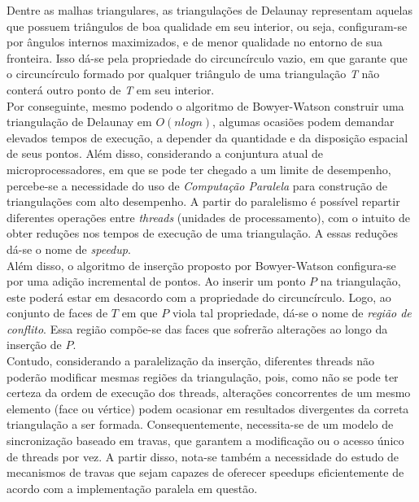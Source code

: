 \documentclass[a4paper, 12pt]{article}
\begin{document}

Dentre as malhas triangulares, as triangulações de Delaunay representam aquelas que possuem triângulos de boa qualidade  
em seu interior, ou seja, configuram-se por ângulos internos maximizados, e de menor qualidade no entorno de sua fronteira. 
Isso dá-se pela propriedade do circuncírculo vazio, em que garante que o circuncírculo formado por qualquer triângulo de uma 
triangulação \textit{T} não conterá outro ponto de \textit{T} em seu interior. \\

Por conseguinte, mesmo podendo o algoritmo de Bowyer-Watson \cite{bowyer, watson} construir uma triangulação de Delaunay em $O(n logn)$, 
algumas ocasiões podem demandar elevados tempos de execução, a depender da quantidade e da disposição espacial de seus pontos. Além disso, 
considerando a conjuntura atual de microprocessadores, em que se pode ter chegado a um limite de desempenho, percebe-se a 
necessidade do uso de \textit{Computação Paralela} para construção de triangulações com  alto desempenho. A partir do 
paralelismo é possível repartir diferentes operações entre \textit{threads} (unidades de processamento), com o intuito de obter 
reduções nos tempos de execução de uma triangulação. A essas reduções dá-se o nome de \textit{speedup}. \\

Além disso, o algoritmo de inserção proposto por Bowyer-Watson configura-se por uma adição incremental de pontos. Ao inserir um ponto $P$ 
na triangulação, este poderá estar em desacordo com a propriedade do circuncírculo. Logo, ao conjunto de faces de $T$ em que $P$ viola tal 
propriedade, dá-se o nome de \textit{região de conflito}. Essa região compõe-se das faces que sofrerão alterações ao longo 
da inserção de $P$. \\

Contudo, considerando a paralelização da inserção, diferentes threads não poderão modificar mesmas regiões da triangulação, pois,
como não se pode ter certeza da ordem de execução dos threads, alterações concorrentes de um mesmo elemento (face ou vértice)  
podem ocasionar em resultados divergentes da correta triangulação a ser formada. Consequentemente, necessita-se de um modelo de 
sincronização baseado em travas, que garantem a modificação ou o acesso único de threads por vez. A partir disso, nota-se 
também a necessidade do estudo de mecanismos de travas que sejam capazes de oferecer speedups eficientemente de acordo com a 
implementação paralela em questão. \\
\end{document}
